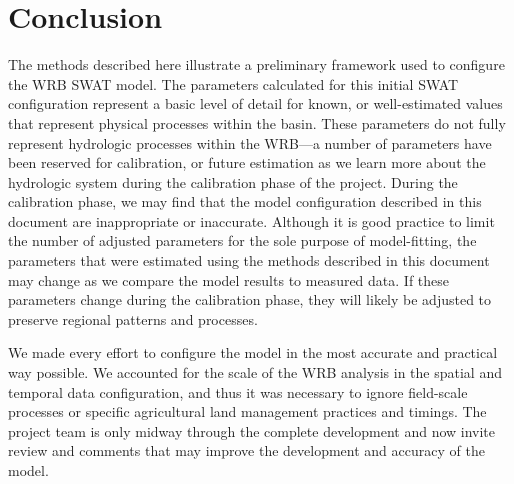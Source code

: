 \section{Conclusion}

The methods described here illustrate a preliminary framework used to configure the WRB SWAT model. The parameters calculated for this initial SWAT configuration represent a basic level of detail for known, or well-estimated values that represent physical processes within the basin. These parameters do not fully represent hydrologic processes within the WRB---a number of parameters have been reserved for calibration, or future estimation as we learn more about the hydrologic system during the calibration phase of the project. During the calibration phase, we may find that the model configuration described in this document are inappropriate or inaccurate. Although it is good practice to limit the number of adjusted parameters for the sole purpose of model-fitting, the parameters that were estimated using the methods described in this document may change as we compare the model results to measured data. If these parameters change during the calibration phase, they will likely be adjusted to preserve regional patterns and processes.

We made every effort to configure the model in the most accurate and practical way possible. We accounted for the scale of the WRB analysis in the spatial and temporal data configuration, and thus it was necessary to ignore field-scale processes or specific agricultural land management practices and timings. The project team is only midway through the complete development and now invite review and comments that may improve  the development and accuracy of the model. 



\pagebreak